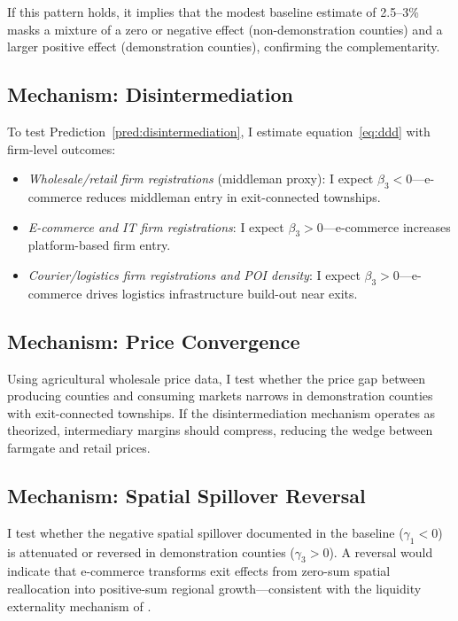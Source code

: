 \documentclass[12pt]{article}
\begin{document}
If this pattern holds, it implies that the modest baseline estimate of 2.5--3\% masks a mixture of a zero or negative effect (non-demonstration counties) and a larger positive effect (demonstration counties), confirming the complementarity.

\subsection{Mechanism: Disintermediation}

To test Prediction~\ref{pred:disintermediation}, I estimate equation~\eqref{eq:ddd} with firm-level outcomes:
\begin{itemize}[nosep]
    \item \textit{Wholesale/retail firm registrations} (middleman proxy): I expect $\beta_3 < 0$---e-commerce reduces middleman entry in exit-connected townships.
    \item \textit{E-commerce and IT firm registrations}: I expect $\beta_3 > 0$---e-commerce increases platform-based firm entry.
    \item \textit{Courier/logistics firm registrations and POI density}: I expect $\beta_3 > 0$---e-commerce drives logistics infrastructure build-out near exits.
\end{itemize}

\subsection{Mechanism: Price Convergence}

Using agricultural wholesale price data, I test whether the price gap between producing counties and consuming markets narrows in demonstration counties with exit-connected townships. If the disintermediation mechanism operates as theorized, intermediary margins should compress, reducing the wedge between farmgate and retail prices.

\subsection{Mechanism: Spatial Spillover Reversal}

I test whether the negative spatial spillover documented in the baseline ($\gamma_1 < 0$) is attenuated or reversed in demonstration counties ($\gamma_3 > 0$). A reversal would indicate that e-commerce transforms exit effects from zero-sum spatial reallocation into positive-sum regional growth---consistent with the liquidity externality mechanism of \citet{pagano1989}.
\end{document}
